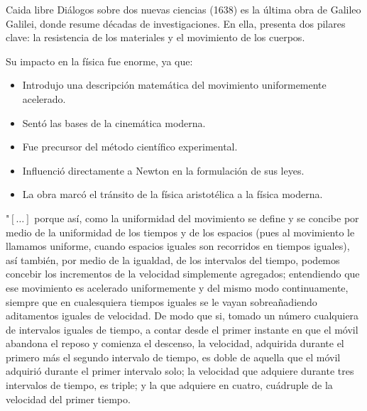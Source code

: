 \begin{frame}{Caida libre}
    Diálogos sobre dos nuevas ciencias (1638) es la última obra de Galileo Galilei, donde resume décadas de investigaciones. En ella, presenta dos pilares clave: la resistencia de los materiales y el movimiento de los cuerpos.

Su impacto en la física fue enorme, ya que:

\begin{itemize}
    \item Introdujo una descripción matemática del movimiento uniformemente acelerado.
    \item Sentó las bases de la cinemática moderna.
    \item Fue precursor del método científico experimental.

    \item Influenció directamente a Newton en la formulación de sus leyes.

    \item La obra marcó el tránsito de la física aristotélica a la física moderna.
\end{itemize}

\end{frame}

\begin{frame}

"$[\dots]$ porque así, como la uniformidad 
del movimiento se define y se concibe por medio de la 
uniformidad de los tiempos y de los espacios (pues al movimiento 
le llamamos uniforme, cuando espacios iguales son recorridos 
en tiempos iguales), así también, por medio de la 
igualdad, de los intervalos del tiempo, podemos concebir los 
incrementos de la velocidad simplemente agregados; entendiendo 
que ese movimiento es acelerado uniformemente y del 
mismo modo continuamente, siempre que en cualesquiera 
tiempos iguales se le vayan sobreañadiendo aditamentos iguales 
de velocidad. De modo que si, tomado un número cualquiera 
de intervalos iguales de tiempo, a contar desde el primer 
instante en que el móvil abandona el reposo y comienza el descenso, 
la velocidad, adquirida durante el primero más el segundo 
intervalo de tiempo, es doble de aquella que el móvil adquirió 
durante el primer intervalo solo; la velocidad que adquiere 
durante tres intervalos de tiempo, es triple; y la que adquiere 
en cuatro, cuádruple de la velocidad del primer tiempo. 
    
\end{frame}

